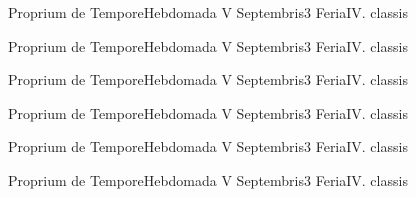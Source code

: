 \documentclass[liber-responsorialis-aestivus.tex]{subfiles}
\begin{document}
	{Proprium de Tempore}{Hebdomada V Septembris}{3}{}
	{Feria}{IV. classis}{}
	{}
	{}

	{Proprium de Tempore}{Hebdomada V Septembris}{3}{}
	{Feria}{IV. classis}{}
	{}
	{}

	{Proprium de Tempore}{Hebdomada V Septembris}{3}{}
	{Feria}{IV. classis}{}
	{}
	{}

	{Proprium de Tempore}{Hebdomada V Septembris}{3}{}
	{Feria}{IV. classis}{}
	{}
	{}

	{Proprium de Tempore}{Hebdomada V Septembris}{3}{}
	{Feria}{IV. classis}{}
	{}
	{}

	{Proprium de Tempore}{Hebdomada V Septembris}{3}{}
	{Feria}{IV. classis}{}
	{}
	{}
\end{document}
